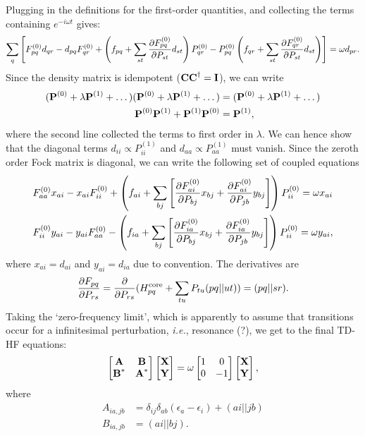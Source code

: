 \documentclass{article}
\begin{document}
Plugging in the definitions for the first-order quantities, and collecting the terms containing $e^{-i\omega t}$ gives:
\begin{equation}
\sum_{q}\left[F_{pq}^{(0)}d_{qr}-d_{pq}F_{qr}^{(0)} +\left( f_{pq}+\sum_{st}\diffp{F_{pq}^{(0)}}{P_{st}}d_{st} \right)P_{qr}^{(0)}-P_{pq}^{(0)}\left( f_{qr}+\sum_{st}\diffp{F_{qr}^{(0)}}{P_{st}}d_{st} \right) \right]=\omega d_{pr}.
\end{equation}
Since the density matrix is idempotent ($\bm{\mathrm{C}}\bm{\mathrm{C}}^{\dagger}=\bm{\mathrm{I}}$), we can write 
\begin{align}
(\bm{\mathrm{P}}^{(0)}+\lambda \bm{\mathrm{P}}^{(1)}+\dots)(\bm{\mathrm{P}}^{(0)}+\lambda \bm{\mathrm{P}}^{(1)}+\dots)&=(\bm{\mathrm{P}}^{(0)}+\lambda \bm{\mathrm{P}}^{(1)}+\dots)\\
\bm{\mathrm{P}}^{(0)}\bm{\mathrm{P}}^{(1)}+\bm{\mathrm{P}}^{(1)}\bm{\mathrm{P}}^{(0)}&=\bm{\mathrm{P}}^{(1)},
\end{align}
where the second line collected the terms to first order in $\lambda$. We can hence show that the diagonal terms $d_{ii}\propto P_{ii}^{(1)}$ and $d_{aa}\propto P_{aa}^{(1)}$ must vanish. Since the zeroth order Fock matrix is diagonal, we can write the following set of coupled equations
\begin{align}
&F_{aa}^{(0)}x_{ai}-x_{ai}F_{ii}^{(0)}+\left( f_{ai}+\sum_{bj}\left[ \diffp{F_{ai}^{(0)}}{P_{bj}}x_{bj}+\diffp{F_{ai}^{(0)}}{P_{jb}}y_{bj} \right] \right)P_{ii}^{(0)}=\omega x_{ai}\\
&F_{ii}^{(0)}y_{ai}-y_{ai}F_{aa}^{(0)}-\left( f_{ia}+\sum_{bj}\left[ \diffp{F_{ia}^{(0)}}{P_{bj}}x_{bj}+\diffp{F_{ia}^{(0)}}{P_{jb}}y_{bj} \right] \right)P_{ii}^{(0)}=\omega y_{ai},
\end{align}
where $x_{ai}=d_{ai}$ and $y_{ai}=d_{ia}$ due to convention. The derivatives are
\begin{equation}
\diffp{F_{pq}}{P_{rs}}=\diffp{}{P_{rs}}(H^{\mathrm{core}}_{pq}+\sum_{tu}P_{tu}(pq||ut))=(pq||sr).
\end{equation}
Taking the `zero-frequency limit', which is apparently to assume that transitions occur for a infinitesimal perturbation, \textit{i.e.}, resonance (?), we get to the final TD-HF equations:
\begin{equation}
\begin{bmatrix}{\bm{\mathrm{A}}}&{\bm{\mathrm{B}}}\\{\bm{\mathrm{B}}^*}&{\bm{\mathrm{A}}^*}\end{bmatrix}\begin{bmatrix}{\bm{\mathrm{X}}}\\{\bm{\mathrm{Y}}}\end{bmatrix}=\omega\begin{bmatrix}{1}&{0}\\{0}&{-1}\end{bmatrix}\begin{bmatrix}{\bm{\mathrm{X}}}\\{\bm{\mathrm{Y}}}\end{bmatrix},
\end{equation}
where
\begin{align}
A_{ia,jb}&=\delta_{ij}\delta_{ab}(\epsilon_a-\epsilon_i)+(ai||jb)\\
B_{ia,jb}&=(ai||bj).
\end{align}
\end{document}
